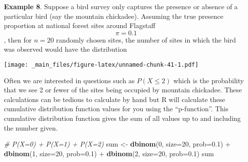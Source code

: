 \documentclass[]{book}
\newenvironment{Shaded}{\begin{snugshade}}{\end{snugshade}}
\newcommand{\KeywordTok}[1]{\textcolor[rgb]{0.13,0.29,0.53}{\textbf{{#1}}}}
\newcommand{\DataTypeTok}[1]{\textcolor[rgb]{0.13,0.29,0.53}{{#1}}}
\newcommand{\DecValTok}[1]{\textcolor[rgb]{0.00,0.00,0.81}{{#1}}}
\newcommand{\FloatTok}[1]{\textcolor[rgb]{0.00,0.00,0.81}{{#1}}}
\newcommand{\StringTok}[1]{\textcolor[rgb]{0.31,0.60,0.02}{{#1}}}
\newcommand{\CommentTok}[1]{\textcolor[rgb]{0.56,0.35,0.01}{\textit{{#1}}}}
\newcommand{\NormalTok}[1]{{#1}}
\begin{document}
\textbf{Example 8}. Suppose a bird survey only captures the presence or
absence of a particular bird (say the mountain chickadee). Assuming the
true presence proportion at national forest sites around Flagstaff
\[\pi=0.1\], then for \(n=20\) randomly chosen sites, the number of
sites in which the bird was observed would have the distribution

\begin{Shaded}
\end{Shaded}

\texttt{[image: \_main\_files/figure-latex/unnamed-chunk-41-1.pdf]}

Often we are interested in questions such as \(P(X\le2)\) which is the
probability that we see 2 or fewer of the sites being occupied by
mountain chickadee. These calculations can be tedious to calculate by
hand but R will calculate these cumulative distribution function values
for you using the ``p-function''. This cumulative distribution function
gives the sum of all values up to and including the number given.

\begin{Shaded}
\begin{Highlighting}[]
\CommentTok{# P(X=0) + P(X=1) + P(X=2)}
\NormalTok{sum <-}\StringTok{ }\KeywordTok{dbinom}\NormalTok{(}\DecValTok{0}\NormalTok{, }\DataTypeTok{size=}\DecValTok{20}\NormalTok{, }\DataTypeTok{prob=}\FloatTok{0.1}\NormalTok{) +}\StringTok{ }
\StringTok{       }\KeywordTok{dbinom}\NormalTok{(}\DecValTok{1}\NormalTok{, }\DataTypeTok{size=}\DecValTok{20}\NormalTok{, }\DataTypeTok{prob=}\FloatTok{0.1}\NormalTok{) +}\StringTok{ }
\StringTok{       }\KeywordTok{dbinom}\NormalTok{(}\DecValTok{2}\NormalTok{, }\DataTypeTok{size=}\DecValTok{20}\NormalTok{, }\DataTypeTok{prob=}\FloatTok{0.1}\NormalTok{)}
\NormalTok{sum}
\end{Highlighting}
\end{Shaded}
\end{document}
